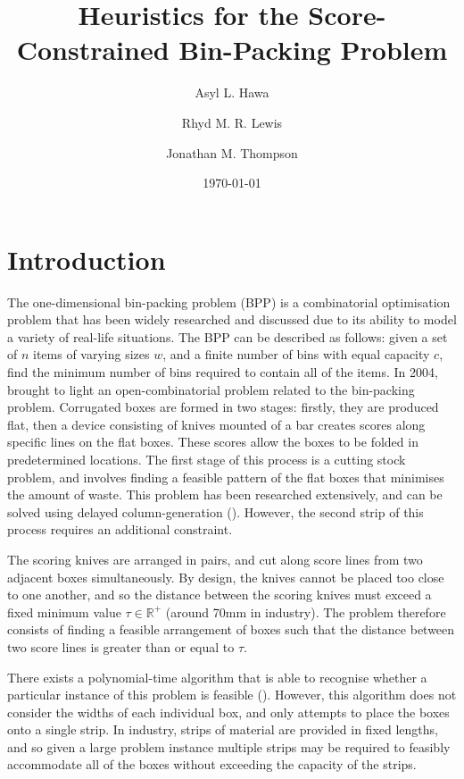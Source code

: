 \documentclass[oribibl]{llncs}
\title{Heuristics for the Score-Constrained Bin-Packing Problem}
\author{Asyl L. Hawa \and Rhyd M. R. Lewis \and Jonathan M. Thompson}
\institute{School of Mathematics, Cardiff University, Senghennydd Road, Cardiff, UK, CF24 4AG}
\date{\today}
\begin{document}
\maketitle

\begin{abstract}
	
\end{abstract}

\section{Introduction}
\label{sec:intro}

The one-dimensional bin-packing problem (BPP) is a combinatorial optimisation problem that has been widely researched and discussed due to its ability to model a variety of real-life situations. The BPP can be described as follows: given a set of $n$ items of varying sizes $w$, and a finite number of bins with equal capacity $c$, find the minimum number of bins required to contain all of the items. In 2004, \citeauthor{goulimis2004} brought to light an open-combinatorial problem related to the bin-packing problem. Corrugated boxes are formed in two stages: firstly, they are produced flat, then a device consisting of knives mounted of a bar creates scores along specific lines on the flat boxes. These scores allow the boxes to be folded in predetermined locations. The first stage of this process is a cutting stock problem, and involves finding a feasible pattern of the flat boxes that minimises the amount of waste. This problem has been researched extensively, and can be solved using delayed column-generation (\citealp{gilmore1961, gilmore1963}). However, the second strip of this process requires an additional constraint.

The scoring knives are arranged in pairs, and cut along score lines from two adjacent boxes simultaneously. By design, the knives cannot be placed too close to one another, and so the distance between the scoring knives must exceed a fixed minimum value $\tau \in \mathbb{R}^{+}$ (around 70mm in industry). The problem therefore consists of finding a feasible arrangement of boxes such that the distance between two score lines is greater than or equal to $\tau$.

There exists a polynomial-time algorithm that is able to recognise whether a particular instance of this problem is feasible (\citealp{becker2010}). However, this algorithm does not consider the widths of each individual box, and only attempts to place the boxes onto a single strip. In industry, strips of material are provided in fixed lengths, and so given a large problem instance multiple strips may be required to feasibly accommodate all of the boxes without exceeding the capacity of the strips.  
\end{document}
